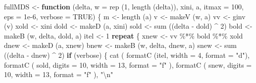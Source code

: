 \documentclass[
  12pt,
]{book}
\newenvironment{Shaded}{\begin{snugshade}}{\end{snugshade}}
\newcommand{\AttributeTok}[1]{\textcolor[rgb]{0.77,0.63,0.00}{#1}}
\newcommand{\ConstantTok}[1]{\textcolor[rgb]{0.00,0.00,0.00}{#1}}
\newcommand{\ControlFlowTok}[1]{\textcolor[rgb]{0.13,0.29,0.53}{\textbf{#1}}}
\newcommand{\DecValTok}[1]{\textcolor[rgb]{0.00,0.00,0.81}{#1}}
\newcommand{\FloatTok}[1]{\textcolor[rgb]{0.00,0.00,0.81}{#1}}
\newcommand{\FunctionTok}[1]{\textcolor[rgb]{0.00,0.00,0.00}{#1}}
\newcommand{\NormalTok}[1]{#1}
\newcommand{\OtherTok}[1]{\textcolor[rgb]{0.56,0.35,0.01}{#1}}
\newcommand{\SpecialCharTok}[1]{\textcolor[rgb]{0.00,0.00,0.00}{#1}}
\newcommand{\StringTok}[1]{\textcolor[rgb]{0.31,0.60,0.02}{#1}}
\theoremstyle{definition}
\theoremstyle{definition}
\theoremstyle{definition}
\theoremstyle{definition}
\theoremstyle{remark}
\begin{document}
\begin{Shaded}
\begin{Highlighting}[]
\NormalTok{fullMDS }\OtherTok{\textless{}{-}}
  \ControlFlowTok{function}\NormalTok{ (delta,}
            \AttributeTok{w =} \FunctionTok{rep}\NormalTok{ (}\DecValTok{1}\NormalTok{, }\FunctionTok{length}\NormalTok{ (delta)),}
\NormalTok{            xini,}
\NormalTok{            a,}
            \AttributeTok{itmax =} \DecValTok{100}\NormalTok{,}
            \AttributeTok{eps =} \FloatTok{1e{-}6}\NormalTok{,}
            \AttributeTok{verbose =} \ConstantTok{TRUE}\NormalTok{) \{}
\NormalTok{    m }\OtherTok{\textless{}{-}} \FunctionTok{length}\NormalTok{ (a)}
\NormalTok{    v }\OtherTok{\textless{}{-}} \FunctionTok{makeV}\NormalTok{ (w, a)}
\NormalTok{    vv }\OtherTok{\textless{}{-}} \FunctionTok{ginv}\NormalTok{ (v)}
\NormalTok{    xold }\OtherTok{\textless{}{-}}\NormalTok{ xini}
\NormalTok{    dold }\OtherTok{\textless{}{-}} \FunctionTok{makeD}\NormalTok{ (a, xini)}
\NormalTok{    sold }\OtherTok{\textless{}{-}} \FunctionTok{sum}\NormalTok{ ((delta }\SpecialCharTok{{-}}\NormalTok{ dold) }\SpecialCharTok{\^{}} \DecValTok{2}\NormalTok{)}
\NormalTok{    bold }\OtherTok{\textless{}{-}} \FunctionTok{makeB}\NormalTok{ (w, delta, dold, a)}
\NormalTok{    itel }\OtherTok{\textless{}{-}} \DecValTok{1}
    \ControlFlowTok{repeat}\NormalTok{ \{}
\NormalTok{      xnew }\OtherTok{\textless{}{-}}\NormalTok{ vv }\SpecialCharTok{\%*\%}\NormalTok{ bold }\SpecialCharTok{\%*\%}\NormalTok{ xold}
\NormalTok{      dnew }\OtherTok{\textless{}{-}} \FunctionTok{makeD}\NormalTok{ (a, xnew)}
\NormalTok{      bnew }\OtherTok{\textless{}{-}} \FunctionTok{makeB}\NormalTok{ (w, delta, dnew, a)}
\NormalTok{      snew }\OtherTok{\textless{}{-}} \FunctionTok{sum}\NormalTok{ ((delta }\SpecialCharTok{{-}}\NormalTok{ dnew) }\SpecialCharTok{\^{}} \DecValTok{2}\NormalTok{)}
      \ControlFlowTok{if}\NormalTok{ (verbose) \{}
        \FunctionTok{cat}\NormalTok{ (}
          \FunctionTok{formatC}\NormalTok{ (itel, }\AttributeTok{width =} \DecValTok{4}\NormalTok{, }\AttributeTok{format =} \StringTok{"d"}\NormalTok{),}
          \FunctionTok{formatC}\NormalTok{ (}
\NormalTok{            sold,}
            \AttributeTok{digits =} \DecValTok{10}\NormalTok{,}
            \AttributeTok{width =} \DecValTok{13}\NormalTok{,}
            \AttributeTok{format =} \StringTok{"f"}
\NormalTok{          ),}
          \FunctionTok{formatC}\NormalTok{ (}
\NormalTok{            snew,}
            \AttributeTok{digits =} \DecValTok{10}\NormalTok{,}
            \AttributeTok{width =} \DecValTok{13}\NormalTok{,}
            \AttributeTok{format =} \StringTok{"f"}
\NormalTok{          ),}
          \StringTok{"}\SpecialCharTok{\textbackslash{}n}\StringTok{"}

\end{Highlighting}
\end{Shaded}
\end{document}
